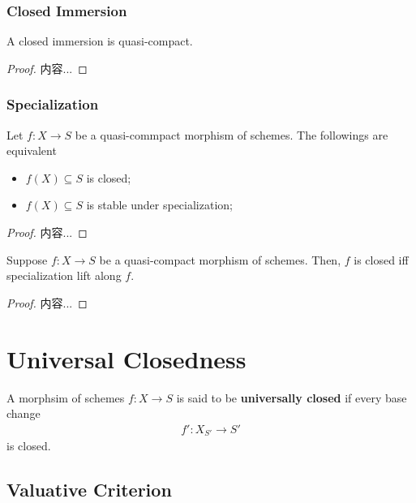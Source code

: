 \documentclass[Total.tex]{subfiles}
\begin{document}
			\begin{proposition}
				
			\end{proposition}
			\subsubsection{Closed Immersion}
			\begin{lemma}
				A closed immersion is quasi-compact.
			\end{lemma}
			\begin{proof}
				内容...
			\end{proof}
			\subsubsection{Specialization}
			
			\begin{proposition}
				Let $f:X\rightarrow S$ be a quasi-commpact morphism of schemes. The followings are equivalent
				\begin{itemize}
					\item $f(X)\subseteq S$ is closed;
					\item $f(X)\subseteq S$ is stable under specialization;
				\end{itemize}
			\end{proposition}
			\begin{proof}
				内容...
			\end{proof}
			\begin{proposition}
				Suppose $f:X\rightarrow S$ be a quasi-compact morphism of schemes. Then, $f$ is closed iff specialization lift along $f$.
			\end{proposition}
			\begin{proof}
				内容...
			\end{proof}
		\section{Universal Closedness}
			\begin{Def}
				A morphsim of schemes $f:X\rightarrow S$ is said to be \textbf{universally closed} if every base change
				\begin{gather*}
					f':X_{S'}\rightarrow S'
				\end{gather*}
				is closed.
			\end{Def}
			\subsection{Valuative Criterion}
\end{document}
